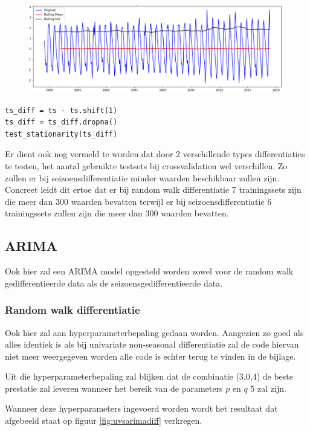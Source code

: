 \begin{figure}
    \centering
    \caption{}
    \label{fig:uvsstationarityrw}
    \includegraphics[width=0.7\linewidth]{uvsstationarityrw}
\end{figure}


\begin{verbatim}
ts_diff = ts - ts.shift(1)
ts_diff = ts_diff.dropna()
test_stationarity(ts_diff)
\end{verbatim}

Er dient ook nog vermeld te worden dat door 2 verschillende types differentiaties te testen, het aantal gebruikte testsets bij crossvalidation wel verschillen. Zo zullen er bij seizoensdifferentiatie minder waarden beschikbaar zullen zijn. Concreet leidt dit ertoe dat er bij random walk differentiatie 7 trainingssets zijn die meer dan 300 waarden bevatten terwijl er bij seizoensdifferentiatie 6 trainingssets zullen zijn die meer dan 300 waarden bevatten.

\subsection{ARIMA}

Ook hier zal een ARIMA model opgesteld worden zowel voor de random walk gedifferentieerde data als de seizoensgedifferentieerde data.
\subsubsection{Random walk differentiatie}

Ook hier zal aan hyperparameterbepaling gedaan worden. Aangezien zo goed als alles identiek is als bij univariate non-seasonal differentiatie zal de code hiervan niet meer weergegeven worden alle code is echter terug te vinden in de bijlage.

Uit die hyperparameterbepaling zal blijken dat de combinatie (3,0,4) de beste prestatie zal leveren wanneer het bereik van de parameters $p$ en $q$ 5 zal zijn. 

Wanneer deze hyperparameters ingevoerd worden wordt het resultaat dat afgebeeld staat op figuur \ref{fig:uvsarimadiff} verkregen.

